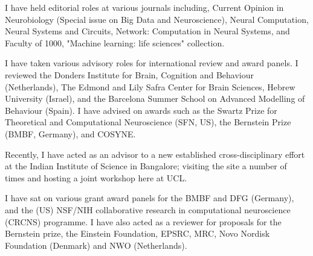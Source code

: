 {I have held editorial roles at various journals including, Current
Opinion in Neurobiology (Special issue on Big Data and Neuroscience),
Neural Computation, Neural Systems and Circuits, Network: Computation
in Neural Systems, and Faculty of 1000, "Machine learning: life
sciences" collection.

I have taken various advisory roles for international review and award
panels. I reviewed the Donders Institute for Brain, Cognition and
Behaviour (Netherlands), The Edmond and Lily Safra Center for Brain
Sciences, Hebrew University (Israel), and the Barcelona Summer School
on Advanced Modelling of Behaviour (Spain). I have advised on awards
such as the Swartz Prize for Theoretical and Computational
Neuroscience (SFN, US), the Bernstein Prize (BMBF, Germany), and
COSYNE.

Recently, I have acted as an advisor to a new established
cross-disciplinary effort at the Indian Institute of Science in
Bangalore; visiting the site a number of times and hosting a joint
workshop here at UCL.

I have sat on various grant award panels for the BMBF and DFG
(Germany), and the (US) NSF/NIH collaborative research in
computational neuroscience (CRCNS) programme. I have also acted as a
reviewer for proposals for the Bernstein prize, the Einstein
Foundation, EPSRC, MRC, Novo Nordisk Foundation (Denmark) and NWO
(Netherlands).




% 
}
